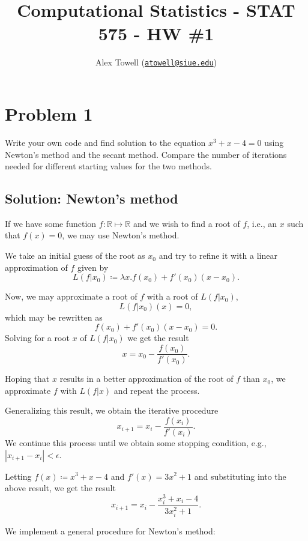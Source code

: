 \documentclass[
  10pt,
  twocolumn]{article}
\title{Computational Statistics - STAT 575 - HW \#1}
\author{Alex Towell
(\href{mailto:atowell@siue.edu}{\nolinkurl{atowell@siue.edu}})}
\date{}
\begin{document}
\maketitle

\hypertarget{problem-1}{%
\section{Problem 1}\label{problem-1}}

Write your own code and find solution to the equation
\(x^3 + x - 4 = 0\) using Newton's method and the secant method. Compare
the number of iterations needed for different starting values for the
two methods.

\hypertarget{solution-newtons-method}{%
\subsection{Solution: Newton's method}\label{solution-newtons-method}}

If we have some function \(f : \mathbb{R} \mapsto \mathbb{R}\) and we
wish to find a root of \(f\), i.e., an \(x\) such that \(f(x) = 0\), we
may use Newton's method.

We take an initial guess of the root as \(x_0\) and try to refine it
with a linear approximation of \(f\) given by \[
  L(f | x_0) \coloneqq \lambda x.f(x_0) + f'(x_0)(x-x_0).
\]

Now, we may approximate a root of \(f\) with a root of \(L(f|x_0)\), \[
  L(f|x_0)(x) = 0,
\] which may be rewritten as \[
  f(x_0) + f'(x_0)(x-x_0) = 0.
\] Solving for a root \(x\) of \(L(f|x_0)\) we get the result \[
  x = x_0 - \frac{f(x_0)}{f'(x_0)}.
\]

Hoping that \(x\) results in a better approximation of the root of \(f\)
than \(x_0\), we approximate \(f\) with \(L(f|x)\) and repeat the
process.

Generalizing this result, we obtain the iterative procedure \[
  x_{i+1} = x_i - \frac{f(x_i)}{f'(x_i)}.
\] We continue this process until we obtain some stopping condition,
e.g., \(|x_{i+1} - x_i| < \epsilon\).

Letting \(f(x) \coloneqq x^3 + x - 4\) and \(f'(x) = 3x^2 + 1\) and
substituting into the above result, we get the result \[
  x_{i+1} = x_i - \frac{x_i^3+x_i-4}{3x_i^2+1}.
\]

We implement a general procedure for Newton's method:
\end{document}
